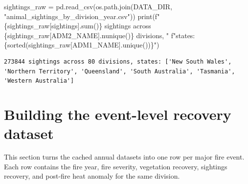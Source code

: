 \documentclass[
  letterpaper,
  DIV=11,
  numbers=noendperiod]{scrartcl}
\newenvironment{Shaded}{\begin{snugshade}}{\end{snugshade}}
\newcommand{\BuiltInTok}[1]{\textcolor[rgb]{0.00,0.23,0.31}{#1}}
\newcommand{\NormalTok}[1]{\textcolor[rgb]{0.00,0.23,0.31}{#1}}
\newcommand{\OperatorTok}[1]{\textcolor[rgb]{0.37,0.37,0.37}{#1}}
\newcommand{\SpecialCharTok}[1]{\textcolor[rgb]{0.37,0.37,0.37}{#1}}
\newcommand{\SpecialStringTok}[1]{\textcolor[rgb]{0.13,0.47,0.30}{#1}}
\newcommand{\StringTok}[1]{\textcolor[rgb]{0.13,0.47,0.30}{#1}}
\begin{document}
\begin{Shaded}
\begin{Highlighting}[]
\NormalTok{sightings\_raw }\OperatorTok{=}\NormalTok{ pd.read\_csv(os.path.join(DATA\_DIR, }\StringTok{"animal\_sightings\_by\_division\_year.csv"}\NormalTok{))}
\BuiltInTok{print}\NormalTok{(}\SpecialStringTok{f"}\SpecialCharTok{\{}\NormalTok{sightings\_raw[}\StringTok{\textquotesingle{}sightings\textquotesingle{}}\NormalTok{]}\SpecialCharTok{.}\BuiltInTok{sum}\NormalTok{()}\SpecialCharTok{\}}\SpecialStringTok{ sightings across }\SpecialCharTok{\{}\NormalTok{sightings\_raw[}\StringTok{\textquotesingle{}ADM2\_NAME\textquotesingle{}}\NormalTok{]}\SpecialCharTok{.}\NormalTok{nunique()}\SpecialCharTok{\}}\SpecialStringTok{ divisions, "}
      \SpecialStringTok{f"states: }\SpecialCharTok{\{}\BuiltInTok{sorted}\NormalTok{(sightings\_raw[}\StringTok{\textquotesingle{}ADM1\_NAME\textquotesingle{}}\NormalTok{].unique())}\SpecialCharTok{\}}\SpecialStringTok{"}\NormalTok{)}
\end{Highlighting}
\end{Shaded}

\begin{verbatim}
273844 sightings across 80 divisions, states: ['New South Wales', 'Northern Territory', 'Queensland', 'South Australia', 'Tasmania', 'Western Australia']
\end{verbatim}

\section{Building the event-level recovery
dataset}\label{building-the-event-level-recovery-dataset}

This section turns the cached annual datasets into one row per major
fire event. Each row contains the fire year, fire severity, vegetation
recovery, sightings recovery, and post-fire heat anomaly for the same
division.
\end{document}
